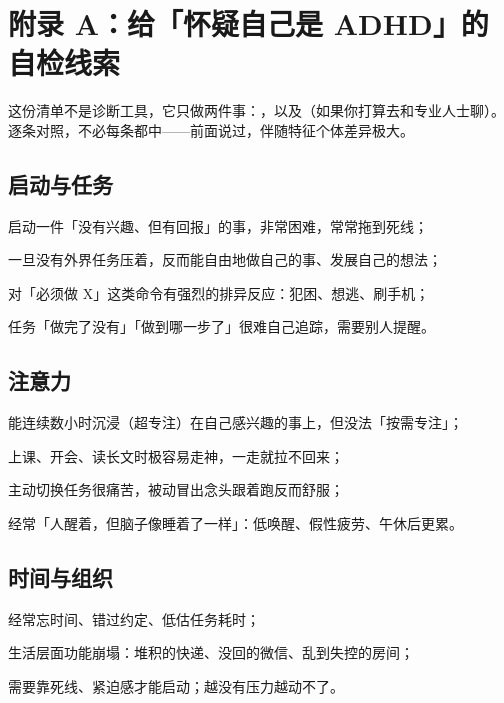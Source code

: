 \appendix

\section*{附录 A：给「怀疑自己是 ADHD」的自检线索}

这份清单不是诊断工具，它只做两件事：，以及（如果你打算去和专业人士聊）。逐条对照，不必每条都中——前面说过，伴随特征个体差异极大。

\subsection*{启动与任务}

\begin{checklist}
  \item 启动一件「没有兴趣、但有回报」的事，非常困难，常常拖到死线；
  \item 一旦没有外界任务压着，反而能自由地做自己的事、发展自己的想法；
  \item 对「必须做 X」这类命令有强烈的排异反应：犯困、想逃、刷手机；
  \item 任务「做完了没有」「做到哪一步了」很难自己追踪，需要别人提醒。
\end{checklist}

\subsection*{注意力}

\begin{checklist}
  \item 能连续数小时沉浸（超专注）在自己感兴趣的事上，但没法「按需专注」；
  \item 上课、开会、读长文时极容易走神，一走就拉不回来；
  \item 主动切换任务很痛苦，被动冒出念头跟着跑反而舒服；
  \item 经常「人醒着，但脑子像睡着了一样」：低唤醒、假性疲劳、午休后更累。
\end{checklist}

\subsection*{时间与组织}

\begin{checklist}
  \item 经常忘时间、错过约定、低估任务耗时；
  \item 生活层面功能崩塌：堆积的快递、没回的微信、乱到失控的房间；
  \item 需要靠死线、紧迫感才能启动；越没有压力越动不了。
\end{checklist}

